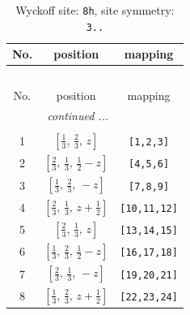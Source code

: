 \documentclass[fleqn,8pt]{jsarticle}
\begin{document}
\begin{longtable}{ccc}
\caption{Wyckoff site: {\tt 8h}, site symmetry: {\tt 3..}}
 \\
 \hline \hline
No. & position & mapping \\ \hline \endfirsthead

\multicolumn{2}{l}{\tablename\ \thetable{}} \\
 \hline \hline
No. & position & mapping \\ \hline \endhead

 \hline \hline
\multicolumn{2}{r}{\footnotesize\it continued ...} \\ \endfoot

 \hline \hline
\multicolumn{2}{r}{} \\ \endlastfoot

1 & $\left[ \frac{1}{3},\, \frac{2}{3},\, z \right]$ & {\tt [1,2,3]} \\ \hline
2 & $\left[ \frac{2}{3},\, \frac{1}{3},\, \frac{1}{2} - z \right]$ & {\tt [4,5,6]} \\ \hline
3 & $\left[ \frac{1}{3},\, \frac{2}{3},\, - z \right]$ & {\tt [7,8,9]} \\ \hline
4 & $\left[ \frac{2}{3},\, \frac{1}{3},\, z + \frac{1}{2} \right]$ & {\tt [10,11,12]} \\ \hline
5 & $\left[ \frac{2}{3},\, \frac{1}{3},\, z \right]$ & {\tt [13,14,15]} \\ \hline
6 & $\left[ \frac{1}{3},\, \frac{2}{3},\, \frac{1}{2} - z \right]$ & {\tt [16,17,18]} \\ \hline
7 & $\left[ \frac{2}{3},\, \frac{1}{3},\, - z \right]$ & {\tt [19,20,21]} \\ \hline
8 & $\left[ \frac{1}{3},\, \frac{2}{3},\, z + \frac{1}{2} \right]$ & {\tt [22,23,24]} \\
\end{longtable}
\renewcommand{\arraystretch}{1.2}
\end{document}
